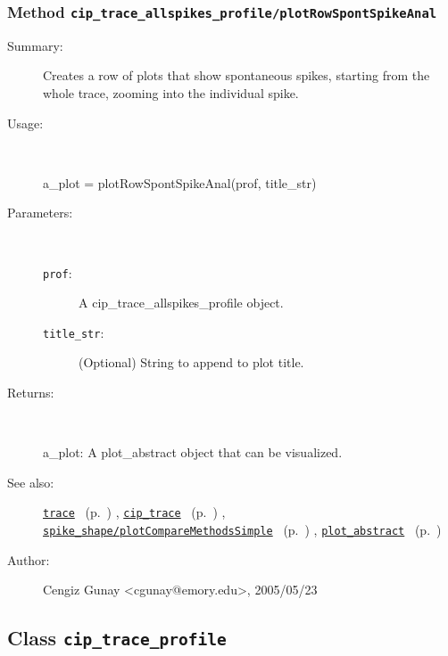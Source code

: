 \subsubsection[Method \texttt{plotRowSpontSpikeAnal}]{Method \texttt{cip\_trace\_allspikes\_profile/plotRowSpontSpikeAnal}}%
%
\label{ref_cip_trace_allspikes_profile__plotRowSpontSpikeAnal}%
\hypertarget{ref_cip_trace_allspikes_profile__plotRowSpontSpikeAnal}{}%
\begin{description}
\item[Summary:]Creates a row of plots that show spontaneous spikes, starting from the whole trace, zooming into the individual spike.
%
\item[Usage:]~%
\begin{lyxcode}%
a\_plot = plotRowSpontSpikeAnal(prof, title\_str)
%
\end{lyxcode}%
%
%
\item[Parameters:]~
\begin{description}%
\item[\texttt{prof}:]
 A cip\_trace\_allspikes\_profile object.
\item[\texttt{title\_str}:]
 (Optional) String to append to plot title.
\end{description}%
%
\item[Returns:]~

	a\_plot: A plot\_abstract object that can be visualized.
%
%
\item[See also:]%
\hyperlink{ref_trace}{\texttt{trace}}%
\ (p.~\pageref{ref_trace})%
%
, \hyperlink{ref_cip_trace}{\texttt{cip\_trace}}%
\ (p.~\pageref{ref_cip_trace})%
%
, \hyperlink{ref_spike_shape__plotCompareMethodsSimple}{\texttt{spike\_shape/plotCompareMethodsSimple}}%
\ (p.~\pageref{ref_spike_shape__plotCompareMethodsSimple})%
%
, \hyperlink{ref_plot_abstract}{\texttt{plot\_abstract}}%
\ (p.~\pageref{ref_plot_abstract})%
%
%
\item[Author:]%
Cengiz Gunay <cgunay@emory.edu>, 2005/05/23%
\end{description}
\methodline%
\subsection{Class \texttt{cip\_trace\_profile}}%
%
\label{ref_cip_trace_profile}%
\hypertarget{ref_cip_trace_profile}{}%
